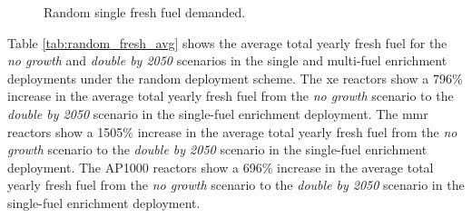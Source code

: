 \begin{figure}[H]
    \hfill
    \caption{Random single fresh fuel demanded.}
    \label{fig:random_of_fresh}
\end{figure}

Table \ref{tab:random_fresh_avg} shows the average total yearly fresh fuel for the \textit{no growth} and \textit{double by 2050} scenarios in the single and multi-fuel enrichment deployments under the random deployment scheme. The \gls{xe} reactors show a 796\% increase in the average total yearly fresh fuel from the \textit{no growth} scenario to the \textit{double by 2050} scenario in the single-fuel enrichment deployment. The \gls{mmr} reactors show a 1505\% increase in the average total yearly fresh fuel from the \textit{no growth} scenario to the \textit{double by 2050} scenario in the single-fuel enrichment deployment. The AP1000 reactors show a 696\% increase in the average total yearly fresh fuel from the \textit{no growth} scenario to the \textit{double by 2050} scenario in the single-fuel enrichment deployment.

